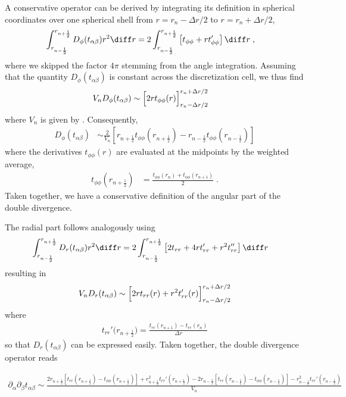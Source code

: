 \documentclass[
	superscriptaddress,
	twocolumn,
	aps, pre
]{revtex4-1}
\newcommand{\dr}{\Delta r}
\begin{document}
A conservative operator can be derived by integrating its definition in spherical coordinates over one spherical shell from $r=r_n - \dr/2$ to $r=r_n  + \dr/2$,
\begin{align}
	\int_{r_{n - \frac12}}^{r_{n + \frac12}} D_\phi(t_{\alpha\beta}) r^2  \diff r
	&= 2\int_{r_{n - \frac12}}^{r_{n + \frac12}} \left[
			t_{\phi \phi} + rt_{\phi \phi }'
		\right]\diff r
	\;,
\end{align}
where we skipped the factor $4\pi$ stemming from the angle integration.
Assuming that the quantity $D_\phi(t_{\alpha\beta})$ is constant across the discretization cell, we thus find
\begin{align}
	V_n D_\phi(t_{\alpha\beta}) 
		&\sim \Bigl[2r t_{\phi \phi}(r)\Bigr]_{r_n - \dr/2}^{r_n + \dr/2}
\end{align}
where $V_n$ is given by . 
Consequently,
\begin{align}
	D_\phi(t_{\alpha\beta}) 
		&\sim \frac{2}{V_n}\left[
			r_{n+\frac12} t_{\phi\phi}(r_{n+\frac12}) - r_{n-\frac12}  t_{\phi\phi}(r_{n-\frac12})
		\right]
\end{align}
where the derivatives $t_{\phi\phi}(r)$ are evaluated at the midpoints by the weighted average,
\begin{align}
	t_{\phi\phi}(r_{n+\frac12}) &= \frac{t_{\phi\phi}(r_{n}) + t_{\phi\phi}(r_{n+1})}{2}
	\;.
\end{align}
Taken together, we have a conservative definition of the angular part of the double divergence.

The radial part follows analogously using
\begin{align}
	\int_{r_{n - \frac12}}^{r_{n + \frac12}} D_r(t_{\alpha\beta}) r^2  \diff r
	&= 2\int_{r_{n - \frac12}}^{r_{n + \frac12}} \left[
			 2 t_{rr} + 4 rt_{rr}' + r^2t_{rr}''
		\right]\diff r	
\end{align}
resulting in
\begin{align}
	V_n D_r(t_{\alpha\beta}) \sim
	\Bigl[2 r t_{rr}(r) + r^2 t_{rr}'(r)\Bigr]_{r_n - \dr/2}^{r_n + \dr/2}
\end{align}
where
\begin{align}
	t_{rr}'\bigl(r_{n + \frac12}\bigr) = \frac{t_{rr}(r_{n+1}) - t_{rr}(r_n)}{\dr}
\end{align}
so that $D_r(t_{\alpha\beta})$ can be expressed easily.
Taken together, the double divergence operator reads
\begin{widetext}
\begin{align}
	\partial_\alpha\partial_\beta t_{\alpha\beta} \sim \frac{
	2 r_{n+\frac12} \left[t_{rr}(r_{n+\frac12}) - t_{\phi\phi}(r_{n+\frac12}) \right]
	+ r_{n+\frac12}^2 t_{rr}'(r_{n+\frac12})
	-2 r_{n-\frac12} \left[t_{rr}(r_{n-\frac12})  -  t_{\phi\phi}(r_{n-\frac12})\right]
	- r_{n-\frac12}^2 t_{rr}'(r_{n-\frac12})
	}{V_n}
\end{align}
\end{widetext}


%
%
\end{document}
